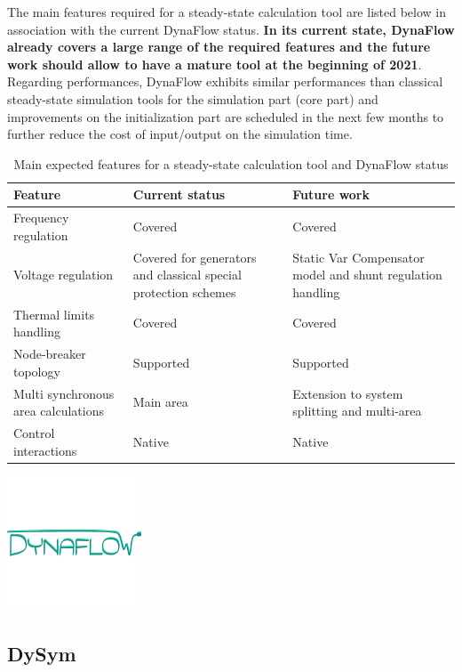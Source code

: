 \documentclass[a4paper, 12pt]{report}
\begin{document}
The main features required for a steady-state calculation tool are listed below in association with the current DynaFlow status. \textbf{In its current state, DynaFlow already covers a large range of the required features and the future work should allow to have a mature tool at the beginning of 2021}. Regarding performances, DynaFlow exhibits similar performances than classical steady-state simulation tools for the simulation part (core part) and improvements on the initialization part are scheduled in the next few months to further reduce the cost of input/output on the simulation time.
\begin{table}[H]
\renewcommand{\arraystretch}{2}
\begin{tabularx}{\linewidth}{X | X | X}
 \textbf{Feature} & \textbf{Current status} & \textbf{Future work} \\
 \hline
 Frequency regulation & Covered & Covered \\
 \hline
 Voltage regulation & Covered for generators  and classical special protection schemes & Static Var Compensator model and shunt regulation handling \\
 \hline
 Thermal limits handling & Covered & Covered \\
 \hline
 Node-breaker topology & Supported & Supported \\
 \hline
 Multi synchronous area calculations & Main area & Extension to system splitting and multi-area \\
 \hline
 Control interactions & Native & Native \\
\end{tabularx}
\caption{Main expected features for a steady-state calculation tool and DynaFlow status}
\end{table}

\begin{center}
\includegraphics[width=0.3\textwidth]{../resources/DynaFlow.png}
\end{center}

\newpage
\subsection{DySym}
\end{document}
